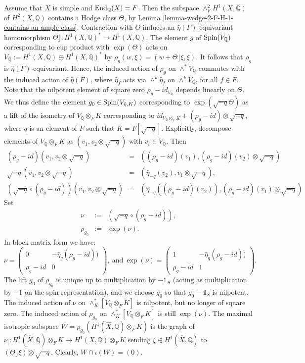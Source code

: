 \documentclass[12pt]{amsart}
\numberwithin{equation}{subsection}
\theoremstyle{plain}
\theoremstyle{definition}
\newcommand{\QQ}{{\mathbb Q}}
\newcommand{\Spin}{{\rm Spin}}
\newcommand{\restricted}[2]{#1_{\mid_{#2}}}
\newcommand{\End}{{\rm End}}
\newcommand{\Contract}{\rfloor}
\newcommand{\one}{{\mathbb 1}}
\begin{document}
{Assume that $X$ is simple and $\End_\QQ(X)=F$.
 Then the subspace $\wedge^2_FH^1(X,\QQ)$ of $H^2(X,\QQ)$ contains a Hodge class $\Theta$, by Lemma \ref{lemma-wedge-2-F-H-1-contains-an-ample-class}.
Contraction with $\Theta$ induces an $\hat{\eta}(F)$-equivariant homomorphism $\Theta\Contract: H^1(X,\QQ)^*\rightarrow H^1(X,\QQ)$.
The element $g$ of $\Spin(V_\QQ)$ corresponding to cup product with $\exp(\Theta)$ acts on $V_\QQ:=H^1(X,\QQ)\oplus H^1(X,\QQ)^*$ 
by $\rho_g(w,\xi)=(w+\Theta\Contract \xi,\xi)$. It follows that $\rho_g$ is $\hat{\eta}(F)$-equivariant. Hence, the induced action of $\rho_g$ on $\wedge^*V_\QQ$ commutes with the induced action of $\hat{\eta}(F)$, where $\hat{\eta}_f$ acts via $\wedge^k\hat{\eta}_f$ on $\wedge^kV_\QQ$, for all $f\in F$.
Note that the nilpotent element of square zero $\rho_g-id_{V_\QQ}$ depends linearly on $\Theta$.
We thus define the element $g_0\in\Spin(V_{\hat{\eta},K})$ corresponding to $\exp(\sqrt{-q}\Theta)$ as a lift of the isometry of $V_\QQ\otimes_F K$ corresponding to $id_{V_\QQ\otimes_F K}+(\rho_g-id)\otimes\sqrt{-q}$, where $q$ is an element of $F$ such that $K=F[\sqrt{-q}]$. 
Explicitly, decompose elements of $V_\QQ\otimes_F K$ as  $(v_1,v_2\otimes\sqrt{-q})$ with $v_i\in V_\QQ$. Then 
\begin{eqnarray*}
(\rho_g-id)(v_1,v_2\otimes\sqrt{-q})&=& ((\rho_g-id)(v_1),(\rho_g-id)(v_2)\otimes\sqrt{-q})
\\
\sqrt{-q}(v_1,v_2\otimes\sqrt{-q})&=&(\hat{\eta}_{-q}(v_2),v_1\otimes\sqrt{-q}),
\\
(\sqrt{-q}\circ (\rho_g-id))(v_1,v_2\otimes\sqrt{-q})&=&(\hat{\eta}_{-q}((\rho_g-id)(v_2)),(\rho_g-id)(v_1)\otimes\sqrt{-q})
\end{eqnarray*}
Set 
\begin{eqnarray*}
\nu&:=&(\sqrt{-q}\circ (\rho_g-id)),
\\
\rho_{g_0}&:=&\exp(\nu).
\end{eqnarray*} 
In block matrix form we have:
\[
\nu=\left(
\begin{array}{cc}
0 & -\hat{\eta}_q(\rho_g-id))
\\
\rho_g-id & 0
\end{array}
\right), \ \mbox{and} \
\exp(\nu)=\left(
\begin{array}{cc}
1 & -\hat{\eta}_q(\rho_g-id))
\\
\rho_g-id & 1
\end{array}
\right).
\]
The lift $g_0$ of $\rho_{g_0}$ is unique up to multiplication by $-\one_S$ (acting as multiplication by $-1$ on the spin representation), and we choose $g_0$ so that $g_0-\one_S$ is nilpotent. The induced action of $\nu$ on $\wedge^*_{K}[V_\QQ\otimes_F K]$ is nilpotent, but no longer of square zero. The induced action of $\rho_{g_0}$ on $\wedge^*_{K}[V_\QQ\otimes_F K]$ is still $\exp(\nu)$. The maximal isotropic subspace $W=\rho_{g_0}(H^1(\hat{X},\QQ)\otimes_F K)$ is the graph of
$\restricted{\nu}{}:H^1(\hat{X},\QQ)\otimes_FK\rightarrow H^1(X,\QQ)\otimes_FK$ sending $\xi\in H^1(\hat{X},\QQ)$ to
$(\Theta\rfloor\xi)\otimes\sqrt{-q}$. Clearly, $W\cap \iota(W)=(0)$.

}
\end{document}

